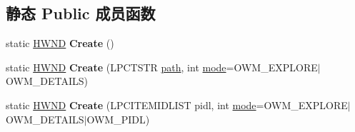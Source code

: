 \subsection*{静态 Public 成员函数}
\begin{DoxyCompactItemize}
\item 
\mbox{\label{struct_m_d_i_main_frame_a39d7e015c15d05b3bacf54c7ada5091f}} 
static \hyperlink{interfacevoid}{H\+W\+ND} {\bfseries Create} ()
\item 
\mbox{\label{struct_m_d_i_main_frame_ad1befee9bc6e355bf5aaa6b3fa480e26}} 
static \hyperlink{interfacevoid}{H\+W\+ND} {\bfseries Create} (L\+P\+C\+T\+S\+TR \hyperlink{structpath}{path}, int \hyperlink{interfacevoid}{mode}=O\+W\+M\+\_\+\+E\+X\+P\+L\+O\+RE$\vert$O\+W\+M\+\_\+\+D\+E\+T\+A\+I\+LS)
\item 
\mbox{\label{struct_m_d_i_main_frame_ae92adf0eafb375e69be627d78fdcdbc5}} 
static \hyperlink{interfacevoid}{H\+W\+ND} {\bfseries Create} (L\+P\+C\+I\+T\+E\+M\+I\+D\+L\+I\+ST pidl, int \hyperlink{interfacevoid}{mode}=O\+W\+M\+\_\+\+E\+X\+P\+L\+O\+RE$\vert$O\+W\+M\+\_\+\+D\+E\+T\+A\+I\+LS$\vert$O\+W\+M\+\_\+\+P\+I\+DL)
\end{DoxyCompactItemize}
